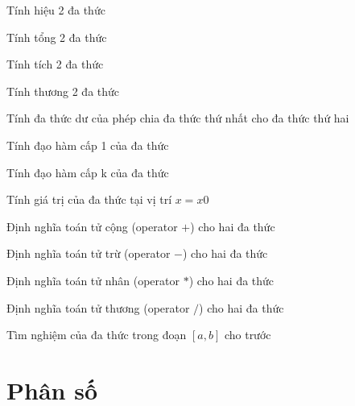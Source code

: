 \begin{problem}
    Tính hiệu 2 đa thức
\end{problem}
\begin{problem}
    Tính tổng 2 đa thức
\end{problem}
\begin{problem}
    Tính tích 2 đa thức
\end{problem}
\begin{problem}
    Tính thương 2 đa thức
\end{problem}
\begin{problem}
    Tính đa thức dư của phép chia đa thức thứ nhất cho đa thức thứ hai
\end{problem}
\begin{problem}
    Tính đạo hàm cấp 1 của đa thức
\end{problem}
\begin{problem}
    Tính đạo hàm cấp k của đa thức
\end{problem}
\begin{problem}
    Tính giá trị của đa thức tại vị trí $x = x0$
\end{problem}
\begin{problem}
    Định nghĩa toán tử cộng (operator $+$) cho hai đa thức
\end{problem}
\begin{problem}
    Định nghĩa toán tử trừ (operator $-$) cho hai đa thức
\end{problem}
\begin{problem}
    Định nghĩa toán tử nhân (operator $*$) cho hai đa thức
\end{problem}
\begin{problem}
    Định nghĩa toán tử thương (operator $/$) cho hai đa thức
\end{problem}
\begin{problem}
    Tìm nghiệm của đa thức trong đoạn $[a, b]$ cho trước
\end{problem}

\section{Phân số}

